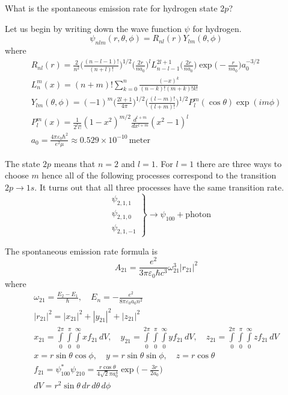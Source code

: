 \documentclass[12pt]{article}
\begin{document}
What is the spontaneous emission rate for hydrogen state 2$p$?

\bigskip
Let us begin by writing down the wave function $\psi$ for hydrogen.
\begin{equation*}
\psi_{nlm}(r,\theta,\phi)=R_{nl}(r)Y_{lm}(\theta,\phi)
\end{equation*}
where
\begin{gather*}
R_{nl}(r)=
\frac{2}{n^2}
\bigg(\frac{(n-l-1)!}{(n+l)!}\bigg)^{1/2}
\bigg(\frac{2r}{na_0}\bigg)^l
L_{n-l-1}^{2l+1}\bigg(\frac{2r}{na_0}\bigg)
\exp\bigg({-}\frac{r}{na_0}\bigg)
a_0^{-3/2}
\\
L_n^m(x)=(n+m)!\sum_{k=0}^n\frac{(-x)^k}{(n-k)!(m+k)!k!}
\\
Y_{lm}(\theta,\phi)=(-1)^m
\bigg(\frac{2l+1}{4\pi}\bigg)^{1/2}
\bigg(\frac{(l-m)!}{(l+m)!}\bigg)^{1/2}
P_l^m(\cos\theta)\exp(im\phi)
\\
P_l^m(x)=\frac{1}{2^l l!}(1-x^2)^{m/2}\frac{d^{l+m}}{dx^{l+m}}(x^2-1)^l
\\
a_0=\frac{4\pi\varepsilon_0\hbar^2}{e^2\mu}\approx0.529\times10^{-10}\,\text{meter}
\end{gather*}

The state $2p$ means that $n=2$ and $l=1$.
For $l=1$ there are three ways to choose $m$ hence all of the following processes correspond to the transition
$2p\rightarrow1s$.
It turns out that all three processes have the same transition rate.
\begin{equation*}
\left.\begin{aligned}
&\psi_{2,1,1}
\\
&\psi_{2,1,0}
\\
&\psi_{2,1,-1}
\end{aligned}\right\}\rightarrow\psi_{100}+\text{photon}
\end{equation*}

The spontaneous emission rate formula is
\begin{equation*}
A_{21}=\frac{e^2}{3\pi\varepsilon_0\hbar c^3}\omega_{21}^3|r_{21}|^2
\tag{1}
\end{equation*}
where
\begin{gather*}
\omega_{21}=\frac{E_2-E_1}{\hbar},\quad E_n=-\frac{e^2}{8\pi\varepsilon_0a_0n^2}
\\
|r_{21}|^2=|x_{21}|^2+|y_{21}|^2+|z_{21}|^2
\\
x_{21}=\int\limits_{0}^{2\pi}\int\limits_{0}^{\pi}\int\limits_{0}^{\infty}xf_{21}\,dV,
\quad
y_{21}=\int\limits_{0}^{2\pi}\int\limits_{0}^{\pi}\int\limits_{0}^{\infty}yf_{21}\,dV,
\quad
z_{21}=\int\limits_{0}^{2\pi}\int\limits_{0}^{\pi}\int\limits_{0}^{\infty}zf_{21}\,dV
\\
x=r\sin\theta\cos\phi,
\quad
y=r\sin\theta\sin\phi,
\quad
z=r\cos\theta
\\
f_{21}=\psi_{100}^*\psi_{210}=\frac{r\cos\theta}{4\sqrt2\pi a_0^4}\exp\bigg({-}\frac{3r}{2a_0}\bigg)
\\
dV=r^2\sin\theta\,dr\,d\theta\,d\phi
\end{gather*}
\end{document}
